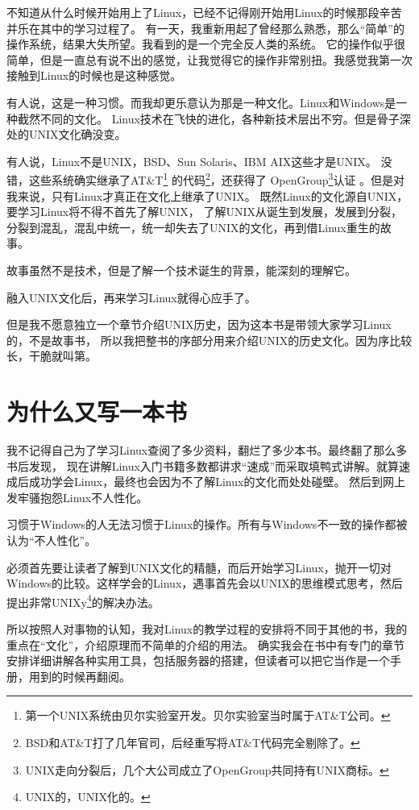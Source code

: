 

不知道从什么时候开始用上了Linux，已经不记得刚开始用Linux的时候那段辛苦并乐在其中的学习过程了。
有一天，我重新用起了曾经那么熟悉，那么“简单”的操作系统，结果大失所望。我看到的是一个完全反人类的系统。
它的操作似乎很简单，但是一直总有说不出的感觉，让我觉得它的操作非常别扭。我感觉我第一次接触到Linux的时候也是这种感觉。

有人说，这是一种习惯。而我却更乐意认为那是一种文化。Linux和Windows是一种截然不同的文化。
Linux技术在飞快的进化，各种新技术层出不穷。但是骨子深处的UNIX文化确没变。

有人说，Linux不是UNIX，BSD、Sun Solaris、IBM AIX这些才是UNIX。
没错，这些系统确实继承了AT\&T\footnote{第一个UNIX系统由贝尔实验室开发。贝尔实验室当时属于AT\&T公司。}
的代码\footnote{BSD和AT\&T打了几年官司，后经重写将AT\&T代码完全剔除了。}，还获得了
OpenGroup\footnote{UNIX走向分裂后，几个大公司成立了OpenGroup共同持有UNIX商标。}认证
。但是对我来说，只有Linux才真正在文化上继承了UNIX。
既然Linux的文化源自UNIX，要学习Linux将不得不首先了解UNIX，
了解UNIX从诞生到发展，发展到分裂，分裂到混乱，混乱中统一，统一却失去了UNIX的文化，再到借Linux重生的故事。

故事虽然不是技术，但是了解一个技术诞生的背景，能深刻的理解它。

融入UNIX文化后，再来学习Linux就得心应手了。

但是我不愿意独立一个章节介绍UNIX历史，因为这本书是带领大家学习Linux的，不是故事书，
所以我把整书的序部分用来介绍UNIX的历史文化。因为序比较长，干脆就叫第。

\section{为什么又写一本书}

我不记得自己为了学习Linux查阅了多少资料，翻烂了多少本书。最终翻了那么多书后发现，
现在讲解Linux入门书籍多数都讲求“速成”而采取填鸭式讲解。就算速成后成功学会Linux，最终也会因为不了解Linux的文化而处处碰壁。
然后到网上发牢骚抱怨Linux不人性化。

\begin{notice}
习惯于Windows的人无法习惯于Linux的操作。所有与Windows不一致的操作都被认为“不人性化”。
\end{notice}

必须首先要让读者了解到UNIX文化的精髓，而后开始学习Linux，抛开一切对Windows的比较。这样学会的Linux，遇事首先会以UNIX的思维模式思考，然后提出非常UNIXy\footnote{UNIX的，UNIX化的。}的解决办法。

所以按照人对事物的认知，我对Linux的教学过程的安排将不同于其他的书，我的重点在“文化”，介绍原理而不简单的介绍的用法。
确实我会在书中有专门的章节安排详细讲解各种实用工具，包括服务器的搭建，但读者可以把它当作是一个手册，用到的时候再翻阅。

